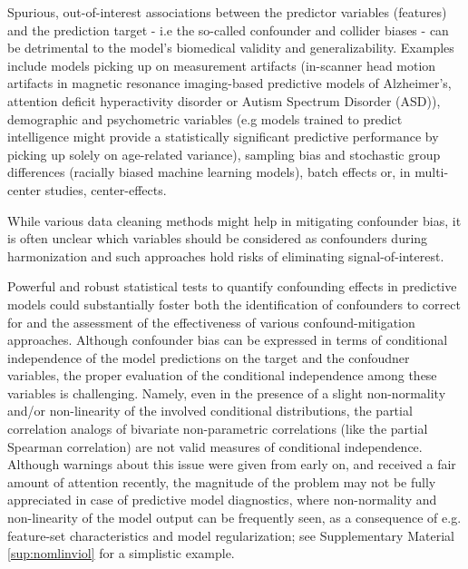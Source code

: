 \documentclass{article}
\begin{document}
Spurious, out-of-interest associations between the predictor variables (features) and the prediction target - i.e the so-called confounder and collider biases\citep{prosperi2020causal} - can be detrimental to the model's biomedical validity and generalizability. Examples include models picking up on measurement artifacts (in-scanner head motion artifacts in magnetic resonance imaging-based predictive models of Alzheimer's\citep{rao2017predictive}, attention deficit hyperactivity disorder\citep{eloyan2012automated, couvy2016head} or Autism Spectrum Disorder (ASD)\citep{gotts2013perils, spisak2014voxel, spisak2019optimal}), demographic and psychometric variables (e.g models trained to predict intelligence\citep{ cole2012global, he2020deep} might provide a statistically significant predictive performance by picking up solely on age-related variance\citep{dubois2018distributed, lohmann2021predicting}), sampling bias and stochastic group differences (racially biased machine learning models\citep{ obermeyer2019dissecting, lwowski2021risk}), batch effects or, in multi-center studies, center-effects.

While various data cleaning methods might help in mitigating confounder bias\citep{rao2017predictive, dukart2011age, spisak2014voxel, abdulkadir2014reduction, rao2017predictive, johnson2007adjusting}, it is often unclear which variables should be considered as confounders during harmonization and such approaches hold risks of eliminating signal-of-interest\citep{wachinger2021detect}.

Powerful and robust statistical tests to quantify confounding effects in predictive models could substantially foster both the identification of confounders to correct for and the assessment of the effectiveness of various confound-mitigation approaches. Although confounder bias can be expressed in terms of conditional independence of the model predictions on the target and the confoudner variables, the proper evaluation of the conditional independence among these variables is challenging. Namely, even in the presence of a slight non-normality and/or non-linearity of the involved conditional distributions, the partial correlation analogs of bivariate non-parametric correlations (like the partial Spearman correlation) are not valid measures of conditional independence. Although warnings about this issue were given from early on\citep{korn1984ranges}, and received a fair amount of attention recently\citep{bergsma2010nonparametric, candes2016panning, peters2016causal,  shah2020hardness, berrett2020conditional}, the magnitude of the problem may not be fully appreciated in case of predictive model diagnostics, where non-normality and non-linearity of the model output can be frequently seen, as a consequence of e.g. feature-set characteristics and model regularization\citep{garcia2009study, kristensen2017whole}; see Supplementary Material \ref{sup:nomlinviol} for a simplistic example.
\end{document}
